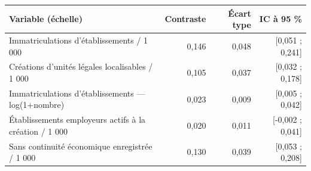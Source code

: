 \begin{tabularx}{\linewidth}{Xrrr}
\toprule
Variable (échelle) & Contraste & Écart type & IC à 95 \% \\
\midrule
Immatriculations d’établissements / 1 000 & 0,146 & 0,048 & [0,051 ; 0,241] \\
Créations d’unités légales localisables / 1 000 & 0,105 & 0,037 & [0,032 ; 0,178] \\
Immatriculations d’établissements — log(1+nombre) & 0,023 & 0,009 & [0,005 ; 0,042] \\
Établissements employeurs actifs à la création / 1 000 & 0,020 & 0,011 & [-0,002 ; 0,041] \\
Sans continuité économique enregistrée / 1 000 & 0,130 & 0,039 & [0,053 ; 0,208] \\
\bottomrule
\end{tabularx}
